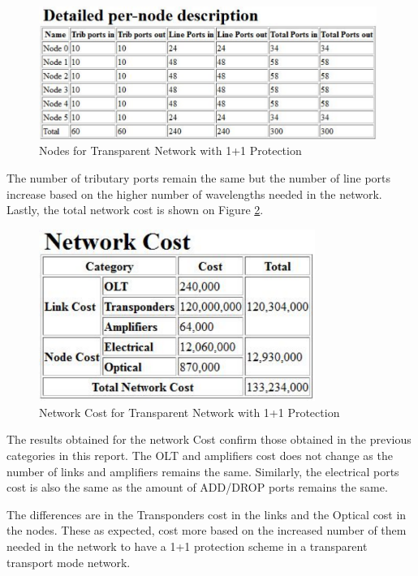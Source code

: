 		\begin{figure}[!h]
			\centering
			\includegraphics[width=11cm]{networkCost_Report_Nodes_Transparent11.pdf}
			\caption{Nodes for Transparent Network with 1+1 Protection}
			\label{networkCost_Report_Nodes_Transparent11}						
		\end{figure}
		
		 The number of tributary ports remain the same but the number of line ports increase based on the higher number of wavelengths needed in the network.\\
		
		Lastly, the total network cost is shown on Figure \ref{networkCost_Report_Cost_Transparent11}.\\
		
		
		\begin{figure}[!h]
			\centering
			\includegraphics[width=9cm]{networkCost_Report_Cost_Transparent11.pdf}	
			\caption{Network Cost for Transparent Network with 1+1 Protection}
			\label{networkCost_Report_Cost_Transparent11}								
		\end{figure}		
		
		The results obtained for the network Cost confirm those obtained in the previous categories in this report. The OLT and amplifiers cost does not change as the number of links and amplifiers remains the same. Similarly, the electrical ports cost is also the same as the amount of ADD/DROP ports remains the same.
		
		The differences are in the Transponders cost in the links and the Optical cost in the nodes. These as expected, cost more based on the increased number of them needed in the network to have a 1+1 protection scheme in a transparent transport mode network.
		
